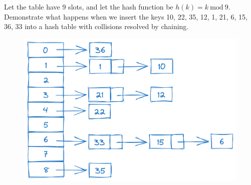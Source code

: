 \noindent {} 
Let the table have 9 slots, and let the hash function be $h(k) = k ~\mathrm{mod}~ 9$. Demonstrate what happens when we insert the keys 10, 22, 35, 12, 1, 21, 6, 15, 36, 33 into a hash table with collisions resolved by chaining.

\begin{figure}[!h]
    \centering
    \includegraphics[width=0.5\linewidth]{HWs/HW6/figures/1.png}
    \label{fig:hash-table}
\end{figure}
